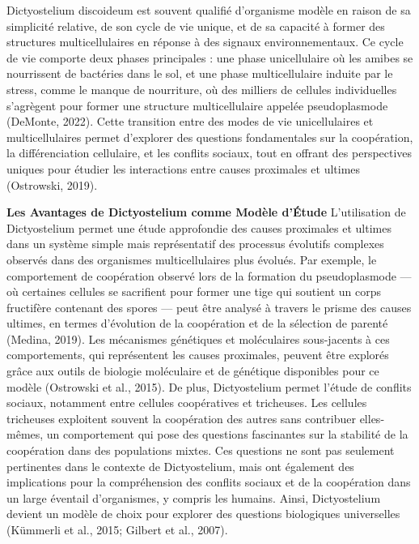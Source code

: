\documentclass[twocolumn,10pt]{article} %
\begin{document}
Dictyostelium discoideum est souvent qualifié d'organisme modèle en raison de sa simplicité relative, 
de son cycle de vie unique, et de sa capacité à former des structures multicellulaires en réponse à des signaux environnementaux. 
Ce cycle de vie comporte deux phases principales : une phase unicellulaire où les amibes se nourrissent de bactéries dans le sol, 
et une phase multicellulaire induite par le stress, comme le manque de nourriture, où des milliers de cellules individuelles 
s'agrègent pour former une structure multicellulaire appelée pseudoplasmode (DeMonte, 2022). Cette transition entre des modes 
de vie unicellulaires et multicellulaires permet d’explorer des questions fondamentales sur la coopération, la différenciation 
cellulaire, et les conflits sociaux, tout en offrant des perspectives uniques pour étudier les interactions entre causes proximales 
et ultimes (Ostrowski, 2019).

\textbf{Les Avantages de Dictyostelium comme Modèle d'Étude}
L'utilisation de Dictyostelium permet une étude approfondie des causes proximales et ultimes dans un système simple mais représentatif des processus évolutifs complexes observés dans des organismes multicellulaires plus évolués. Par exemple, le comportement de coopération observé lors de la formation du pseudoplasmode — où certaines cellules se sacrifient pour former une tige qui soutient un corps fructifère contenant des spores — peut être analysé à travers le prisme des causes ultimes, en termes d'évolution de la coopération et de la sélection de parenté (Medina, 2019). Les mécanismes génétiques et moléculaires sous-jacents à ces comportements, qui représentent les causes proximales, peuvent être explorés grâce aux outils de biologie moléculaire et de génétique disponibles pour ce modèle (Ostrowski et al., 2015).
De plus, Dictyostelium permet l'étude de conflits sociaux, notamment entre cellules coopératives et tricheuses. Les cellules tricheuses exploitent souvent la coopération des autres sans contribuer elles-mêmes, un comportement qui pose des questions fascinantes sur la stabilité de la coopération dans des populations mixtes. Ces questions ne sont pas seulement pertinentes dans le contexte de Dictyostelium, mais ont également des implications pour la compréhension des conflits sociaux et de la coopération dans un large éventail d’organismes, y compris les humains. Ainsi, Dictyostelium devient un modèle de choix pour explorer des questions biologiques universelles (Kümmerli et al., 2015; Gilbert et al., 2007).
\end{document}

